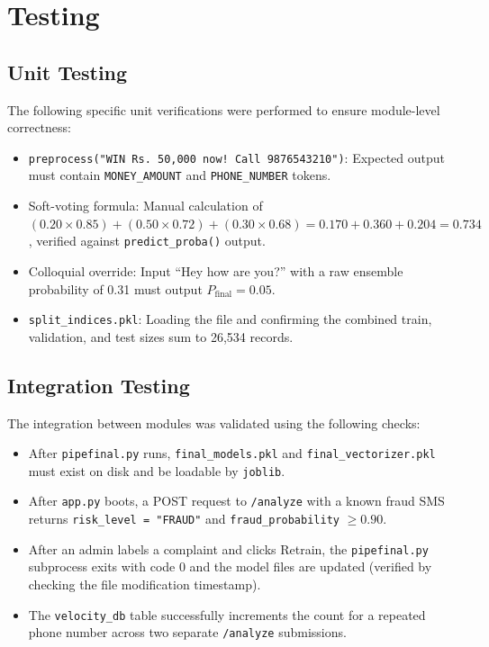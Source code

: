 \section{Testing}

\subsection{Unit Testing}
The following specific unit verifications were performed to ensure module-level correctness:
\begin{itemize}
    \item \texttt{preprocess("WIN Rs. 50,000 now! Call 9876543210")}: Expected output must contain \texttt{MONEY\_AMOUNT} and \texttt{PHONE\_NUMBER} tokens.
    \item Soft-voting formula: Manual calculation of $(0.20 \times 0.85) + (0.50 \times 0.72) + (0.30 \times 0.68) = 0.170 + 0.360 + 0.204 = 0.734$, verified against \texttt{predict\_proba()} output.
    \item Colloquial override: Input ``Hey how are you?'' with a raw ensemble probability of 0.31 must output $P_{\text{final}} = 0.05$.
    \item \texttt{split\_indices.pkl}: Loading the file and confirming the combined train, validation, and test sizes sum to 26,534 records.
\end{itemize}

\subsection{Integration Testing}
The integration between modules was validated using the following checks:
\begin{itemize}
    \item After \texttt{pipefinal.py} runs, \texttt{final\_models.pkl} and \texttt{final\_vectorizer.pkl} must exist on disk and be loadable by \texttt{joblib}.
    \item After \texttt{app.py} boots, a POST request to \texttt{/analyze} with a known fraud SMS returns \texttt{risk\_level = "FRAUD"} and \texttt{fraud\_probability} $\geq 0.90$.
    \item After an admin labels a complaint and clicks Retrain, the \texttt{pipefinal.py} subprocess exits with code 0 and the model files are updated (verified by checking the file modification timestamp).
    \item The \texttt{velocity\_db} table successfully increments the count for a repeated phone number across two separate \texttt{/analyze} submissions.
\end{itemize}

